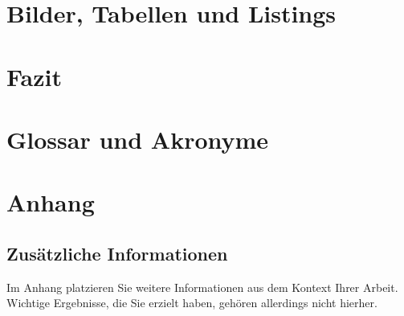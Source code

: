 \documentclass[
    12pt,
    a4paper,
    doubleside,
    BCOR=10mm,
    parskip=half,
    ngerman
]{scrbook}
\begin{document}
%

\chapter{Bilder, Tabellen und Listings}\label{sec:BilderTabellenListings}


\chapter{Fazit}\label{sec:summary}


\backmatter

\chapter{Glossar und Akronyme}\label{sec:glossary}


\singlespacing{}
\printnoidxglossary[type=\acronymtype,title={Abkürzungen\label{akronyme}}]
\printnoidxglossary[title={Glossar}]

\newpage
{}



\newpage
\chapter{Anhang}\label{appendix}
\section{Zusätzliche Informationen}\label{att:bigpicture}
Im Anhang platzieren Sie weitere Informationen aus dem Kontext Ihrer Arbeit.
Wichtige Ergebnisse, die Sie erzielt haben, gehören allerdings nicht hierher.
\end{document}
